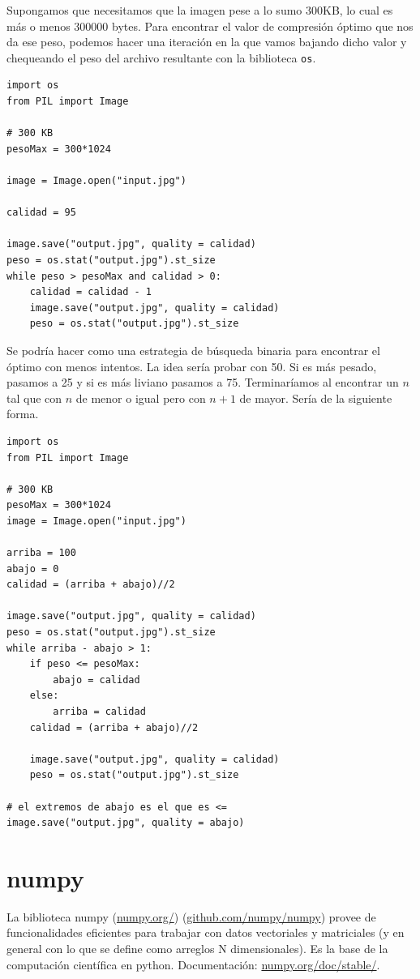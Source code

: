 \documentclass[a4paper, 12pt]{report}
\theoremstyle{definition}
\begin{document}
Supongamos que necesitamos que la imagen pese a lo sumo 300KB, lo cual es más o menos 300000 bytes. Para encontrar el valor de compresión óptimo que nos da ese peso, podemos hacer una iteración en la que vamos bajando dicho valor y chequeando el peso del archivo resultante con la biblioteca {\tt os}.
\begin{verbatim}
import os
from PIL import Image

# 300 KB
pesoMax = 300*1024

image = Image.open("input.jpg")

calidad = 95

image.save("output.jpg", quality = calidad)
peso = os.stat("output.jpg").st_size
while peso > pesoMax and calidad > 0:
    calidad = calidad - 1
    image.save("output.jpg", quality = calidad)
    peso = os.stat("output.jpg").st_size
\end{verbatim}
Se podría hacer como una estrategia de búsqueda binaria para encontrar el óptimo con menos intentos. La idea sería probar con 50. Si es más pesado, pasamos a 25 y si es más liviano pasamos a 75. Terminaríamos al encontrar un $n$ tal que con $n$ de menor o igual pero con $n+1$ de mayor. Sería de la siguiente forma.
\begin{verbatim}
import os
from PIL import Image

# 300 KB
pesoMax = 300*1024
image = Image.open("input.jpg")

arriba = 100
abajo = 0
calidad = (arriba + abajo)//2

image.save("output.jpg", quality = calidad)
peso = os.stat("output.jpg").st_size
while arriba - abajo > 1:
    if peso <= pesoMax:
        abajo = calidad
    else:
        arriba = calidad
    calidad = (arriba + abajo)//2
    
    image.save("output.jpg", quality = calidad)
    peso = os.stat("output.jpg").st_size

# el extremos de abajo es el que es <=
image.save("output.jpg", quality = abajo)
\end{verbatim}

\section{numpy}

La biblioteca numpy (\href{https://numpy.org/}{numpy.org/}) (\href{https://github.com/numpy/numpy}{github.com/numpy/numpy}) provee de funcionalidades eficientes para trabajar con datos vectoriales y matriciales (y en general con lo que se define como arreglos N dimensionales). Es la base de la computación científica en python. Documentación: \href{https://numpy.org/doc/stable/}{numpy.org/doc/stable/}.
\end{document}
